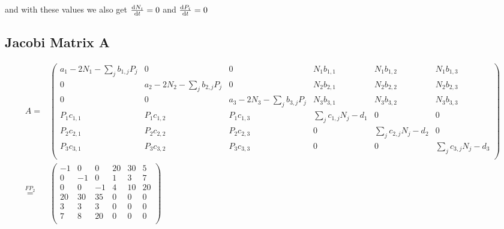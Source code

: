 \documentclass[11pt, a4paper, reqno]{scrartcl}
\begin{document}
    and with these values we also get $\frac{\text d N_i}{\text d t} = 0$ and $\frac{\text d P_i}{\text d t} = 0$
    
    \subsection{Jacobi Matrix A}
    
    \begin{align}
        A =& \left(\begin{smallmatrix}
            a_1-2N_1-\sum_j b_{1,j}P_j & 0 & 0 & N_1b_{1,1} & N_1b_{1,2} & N_1b_{1,3}\\
            0 & a_2-2N_2-\sum_j b_{2,j}P_j & 0 & N_2b_{2,1} & N_2b_{2,2} & N_2b_{2,3}\\
            0 & 0 & a_3-2N_3-\sum_j b_{3,j}P_j & N_3b_{3,1} & N_3b_{3,2} & N_3b_{3,3}\\
            P_1c_{1,1} & P_1c_{1,2} & P_1c_{1,3} & \sum_j c_{1,j}N_j -d_1 & 0 & 0\\
            P_2c_{2,1} & P_2c_{2,2} & P_2c_{2,3} & 0 & \sum_j c_{2,j}N_j -d_2 & 0\\
            P_3c_{3,1} & P_3c_{3,2} & P_3c_{3,3} & 0 & 0 & \sum_j c_{3,j}N_j -d_3\\
        \end{smallmatrix}\right)\\
        \overset{FP_2}{=}& \begin{pmatrix}
            -1 & 0 & 0 & 20 & 30 & 5\\
            0 & -1 & 0 & 1 & 3 & 7\\
            0 & 0 & -1 & 4 & 10 & 20\\
            20 & 30 & 35 & 0 & 0 & 0\\
            3 & 3 & 3 & 0 & 0 & 0\\
            7 & 8 & 20 & 0 & 0 & 0\\
        \end{pmatrix}
    \end{align}
    
\end{document}
